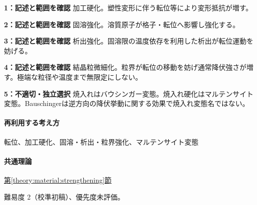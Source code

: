 \noindent\textbf{1：記述と範囲を確認} 加工硬化。塑性変形に伴う転位等により変形抵抗が増す。\par

\noindent\textbf{2：記述と範囲を確認} 固溶強化。溶質原子が格子・転位へ影響し強化する。\par

\noindent\textbf{3：記述と範囲を確認} 析出強化。固溶限の温度依存を利用した析出が転位運動を妨げる。\par

\noindent\textbf{4：記述と範囲を確認} 結晶粒微細化。粒界が転位の移動を妨げ通常降伏強さが増す。極端な粒径や温度まで無限定にしない。\par

\noindent\textbf{5：不適切・独立選択} 焼入れはバウシンガー変態。焼入れ硬化はマルテンサイト変態。Bauschingerは逆方向の降伏挙動に関する効果で焼入れ変態名ではない。\par

\paragraph{再利用する考え方} 転位、加工硬化、固溶・析出・粒界強化、マルテンサイト変態

\paragraph{共通理論} \hyperref[theory:material:strengthening]{第\ref*{theory:material:strengthening}節}

\par 難易度 2（校準初稿）、優先度未評価。

